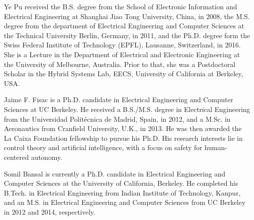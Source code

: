 \documentclass[journal]{IEEEtran}
\begin{document}
\begin{IEEEbiography}{Ye Pu}
	received the B.S. degree from the School of Electronic Information and Electrical Engineering at Shanghai Jiao Tong University, China, in 2008, the M.S. degree from the department of Electrical Engineering and Computer Sciences at the Technical University Berlin, Germany, in 2011, and the Ph.D. degree form the Swiss Federal Institute of Technology (EPFL), Lausanne, Switzerland, in 2016. She is a Lecture in the Department of Electrical and Electronic Engineering at the University of Melbourne, Australia. Prior to that, she was a Postdoctoral Scholar in the Hybrid Systems Lab, EECS, University of California at Berkeley, USA.\vspace{-2cm}
\end{IEEEbiography}
\begin{IEEEbiography}{Jaime F. Fisac}
	is a Ph.D. candidate in Electrical Engineering and Computer Sciences at UC Berkeley. He received a B.S./M.S. degree in Electrical Engineering from the Universidad Politécnica de Madrid, Spain, in 2012, and a M.Sc. in Aeronautics from Cranfield University, U.K., in 2013. He was then awarded the La Caixa Foundation fellowship to pursue his Ph.D. His research interests lie in control theory and artificial intelligence, with a focus on safety for human-centered autonomy.\vspace{-2cm}
\end{IEEEbiography}
\begin{IEEEbiography}{Somil Bansal}
	is currently a Ph.D. candidate in Electrical Engineering and Computer Sciences at the University of California, Berkeley. He completed his B.Tech. in Electrical Engineering from Indian Institute of Technology, Kanpur, and an M.S. in  Electrical Engineering and Computer Sciences from UC Berkeley in 2012 and 2014, respectively.\vspace{-2cm}
\end{IEEEbiography}
\end{document}
